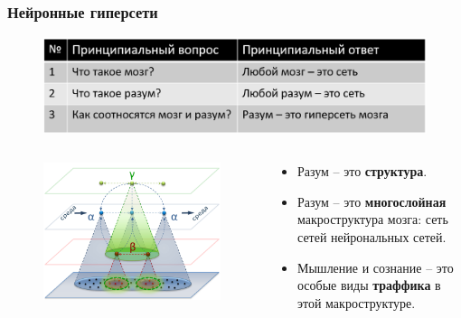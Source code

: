 \documentclass[default]{beamer}
\begin{document}
	\begin{frame}
		\frametitle{Нейронные гиперсети}
		
		\begin{figure}
			\includegraphics[width=\textwidth]{quest-answer}
		\end{figure}
		\begin{columns}
			\begin{column}{0.3\textwidth}
				\begin{figure}
					\includegraphics[width=\textwidth]{layers}
				\end{figure}
			\end{column}
			\begin{column}{0.7\textwidth}
				\begin{itemize}
					\item Разум – это \textbf{структура}.
					\item Разум – это \textbf{многослойная} макроструктура мозга: сеть сетей нейрональных сетей.
					\item Мышление и сознание – это особые виды \textbf{траффика} в этой макроструктуре.
				\end{itemize}
			\end{column}
		\end{columns}
	\end{frame}	
	
\end{document}
